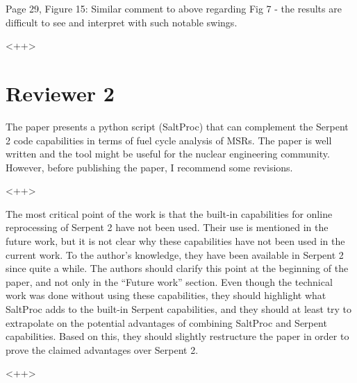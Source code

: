 \documentclass[answers,11pt]{exam}
\begin{document}
\begin{questions}
        \question  Page 29, Figure 15: Similar comment to above regarding Fig 7 
        - the results are difficult to see and interpret with such notable 
        swings.
        \begin{solution}
                <++>
        \end{solution}





        \section*{Reviewer 2}

        \question The paper presents a python script (SaltProc) that can 
        complement the Serpent 2 code capabilities in terms of fuel cycle 
        analysis of MSRs. The paper is well written and the tool might be 
        useful for the nuclear engineering community. However, before 
        publishing the paper, I recommend some revisions.
        \begin{solution}
                <++>
        \end{solution}


        \question The most critical point of the work is that the built-in 
        capabilities for online reprocessing of Serpent 2 have not been used. 
        Their use is mentioned in the future work, but it is not clear why 
        these capabilities have not been used in the current work. To the 
        author's knowledge, they have been available in Serpent 2 since quite a 
        while. The authors should clarify this point at the beginning of the 
        paper, and not only in the ``Future work'' section. Even though the 
        technical work was done without using these capabilities, they should 
        highlight what  SaltProc adds to the built-in Serpent capabilities, and 
        they should at least try to extrapolate on the potential advantages of 
        combining  SaltProc and Serpent capabilities. Based on this, they 
        should slightly restructure the paper in order to prove the claimed 
        advantages over Serpent 2.
        \begin{solution}
                <++>
        \end{solution}


\end{questions}
\end{document}
